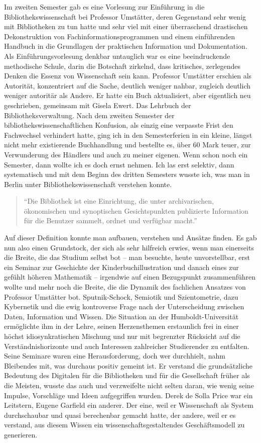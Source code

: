 \documentclass[a4paper,
fontsize=11pt,
oneside,
numbers=noperiodatend,
parskip=half-,
bibliography=totoc,
final
]{scrartcl}
\begin{document}
Im zweiten Semester gab es eine Vorlesung zur Einführung in die
Bibliothekswissenschaft bei Professor Umstätter, deren Gegenstand sehr
wenig mit Bibliotheken zu tun hatte und sehr viel mit einer überraschend
drastischen Dekonstruktion von Fachinformationsprogrammen und einem
einführenden Handbuch in die Grundlagen der praktischen Information und
Dokumentation. Als Einführungsvorlesung denkbar untauglich war es eine
beeindruckende methodische Schule, darin die Botschaft zirkelnd, dass
kritisches, zerlegendes Denken die Essenz von Wissenschaft sein kann.
Professor Umstätter erschien als Autorität, konzentriert auf die Sache,
deutlich weniger nahbar, zugleich deutlich weniger autoritär als Andere.
Er hatte ein Buch aktualisiert, aber eigentlich neu geschrieben,
gemeinsam mit Gisela Ewert. Das Lehrbuch der Bibliotheksverwaltung. Nach
dem zweiten Semester der bibliothekswissenschaftlichen Konfusion, als
einzig eine verpasste Frist den Fachwechsel verhindert hatte, ging ich
in den Semesterferien in ein kleine, längst nicht mehr existierende
Buchhandlung und bestellte es, über 60 Mark teuer, zur Verwunderung des
Händlers und auch zu meiner eigenen. Wenn schon noch ein Semester, dann
wollte ich es doch ernst nehmen. Ich las erst selektiv, dann
systematisch und mit dem Beginn des dritten Semesters wusste ich, was
man in Berlin unter Bibliothekswissenschaft verstehen konnte.

\begin{quote}
\enquote{Die Bibliothek ist eine Einrichtung, die unter archivarischen,
ökonomischen und synoptischen Gesichtspunkten publizierte Information
für die Benutzer sammelt, ordnet und verfügbar macht.}
\end{quote}

Auf dieser Definition konnte man aufbauen, verstehen und Ansätze finden.
Es gab nun also einen Grundstock, der sich als sehr hilfreich erwies,
wenn man einerseits die Breite, die das Studium selbst bot -- man
besuchte, heute unvorstellbar, erst ein Seminar zur Geschichte der
Kinderbuchillustration und danach eines zur gefühlt höheren Mathematik
-- irgendwie auf einen Bezugspunkt zusammenführen wollte und mehr noch
die Breite, die die Dynamik des fachlichen Ansatzes von Professor
Umstätter bot. Sputnik-Schock, Semiotik und Szientometrie, dazu
Kybernetik und die ewig kontroverse Frage nach der Unterscheidung
zwischen Daten, Information und Wissen. Die Situation an der
Humboldt-Universität ermöglichte ihm in der Lehre, seinen Herzensthemen
erstaunlich frei in einer höchst idiosynkratischen Mischung und nur mit
begrenzter Rücksicht auf die Verständnishorizonte und auch Interessen
zahlreicher Studierender zu entfalten. Seine Seminare waren eine
Herausforderung, doch wer durchhielt, nahm Bleibendes mit, was durchaus
positiv gemeint ist. Er verstand die grundsätzliche Bedeutung des
Digitalen für die Bibliotheken und für die Gesellschaft früher als die
Meisten, wusste das auch und verzweifelte nicht selten daran, wie wenig
seine Impulse, Vorschläge und Ideen aufgegriffen wurden. Derek de Solla
Price war ein Leitstern, Eugene Garfield ein anderer. Der eine, weil er
Wissenschaft als System durchschaubar und quasi berechenbar gemacht
hatte, der andere, weil er es verstand, aus diesem Wissen ein
wissenschaftsgestaltendes Geschäftsmodell zu generieren.
\end{document}

